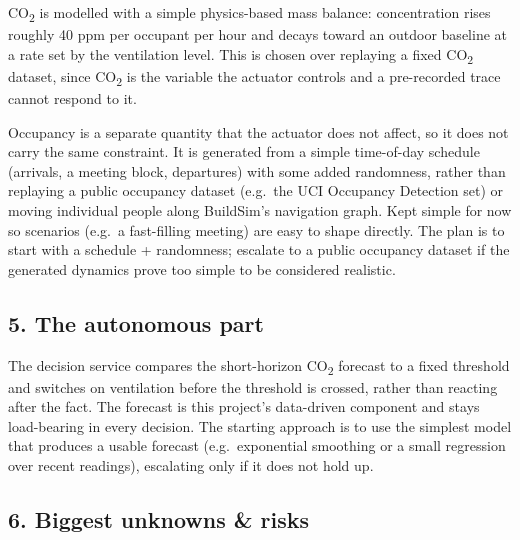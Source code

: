 \documentclass[
  11pt,
]{article}
\begin{document}
CO\textsubscript{2} is modelled with a simple physics-based mass balance: concentration
rises roughly 40 ppm per occupant per hour and decays toward an outdoor
baseline at a rate set by the ventilation level. This is chosen over
replaying a fixed CO\textsubscript{2} dataset, since CO\textsubscript{2} is the variable 
the actuator controls and a pre-recorded trace cannot respond to it.

Occupancy is a separate quantity that the actuator does not affect, so it
does not carry the same constraint. It is generated from a simple
time-of-day schedule (arrivals, a meeting block, departures) with some
added randomness, rather than replaying a public occupancy dataset
(e.g.\ the UCI Occupancy Detection set) or moving individual people along
BuildSim's navigation graph. Kept simple for now so scenarios (e.g.\ a
fast-filling meeting) are easy to shape directly. The plan is to start with a
schedule + randomness; escalate to a public occupancy dataset if the
generated dynamics prove too simple to be considered realistic.

\subsection{5. The autonomous part}\label{the-autonomous-part}

The decision service compares the short-horizon CO\textsubscript{2} forecast to a fixed 
threshold and switches on ventilation before the threshold is crossed,
rather than reacting after the fact. The forecast is this project's
data-driven component and stays load-bearing in every decision.
The starting approach is to use the simplest model that produces a usable
forecast (e.g.\ exponential smoothing or a small regression over recent
readings), escalating only if it does not hold up.

\subsection{6. Biggest unknowns \& risks}\label{biggest-unknowns-risks}
\end{document}
